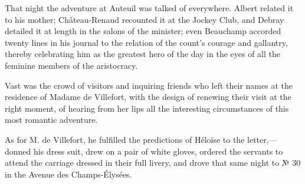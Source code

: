  That night the adventure at Auteuil was talked of everywhere. Albert related it to his mother; Château-Renaud recounted it at the Jockey Club, and Debray detailed it at length in the salons of the minister; even Beauchamp accorded twenty lines in his journal to the relation of the count's courage and gallantry, thereby celebrating him as the greatest hero of the day in the eyes of all the feminine members of the aristocracy. 

 Vast was the crowd of visitors and inquiring friends who left their names at the residence of Madame de Villefort, with the design of renewing their visit at the right moment, of hearing from her lips all the interesting circumstances of this most romantic adventure. 

 As for M. de Villefort, he fulfilled the predictions of Héloïse to the letter,—donned his dress suit, drew on a pair of white gloves, ordered the servants to attend the carriage dressed in their full livery, and drove that same night to № 30 in the Avenue des Champs-Élysées. 